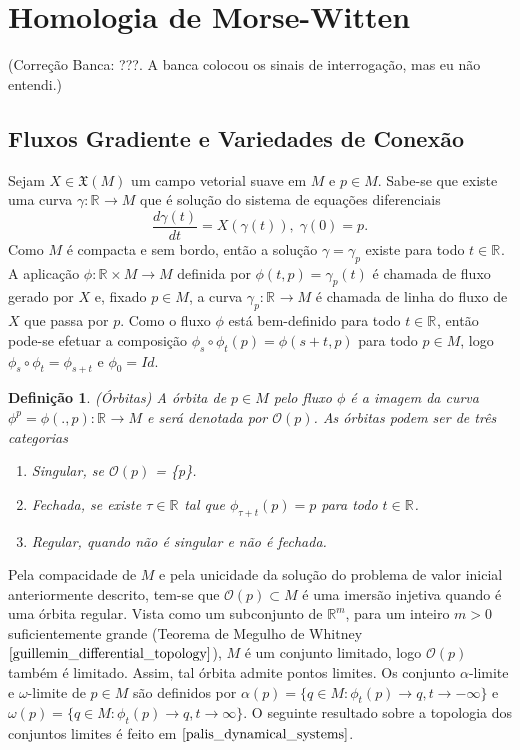 \documentclass[12pt]{book}
\newtheorem{definicao}[teorema]{Definição}
\newcommand{\campossuaves}[1]{\mathfrak{X}(#1)}
\newcommand{\derivada}[2]{\frac{d #1}{d #2}}
\newcommand{\orbitaponto}[1]{\mathcal{O}(#1)}
\newcommand{\retacartesianovariedade}{\real{} \times M}
\newcommand{\real}[1]{\mathbb{R}^{#1}}
\newcommand{\reta}{\real{}}
\newcommand{\alerta}[1]{{\color{red}#1}}
\newcommand{\correcaobanca}[1]{\alerta{(Correção Banca: #1)}}
\begin{document}
	
	\section{Homologia de Morse-Witten}
	\correcaobanca{???. A banca colocou os sinais de interrogação, mas eu não entendi.}
	\subsection{Fluxos Gradiente e Variedades de Conexão}\label{secao_fluxo_gradiente}
	Sejam $X \in \campossuaves{M}$ um campo vetorial suave em $M$ e $p \in M$. Sabe-se que existe uma curva $\gamma: \reta\to M$ que é solução do sistema de equações diferenciais 
	$$
	\derivada{\gamma(t)}{t} = X(\gamma(t)), \; \gamma(0) = p.
	$$
	Como $M$ é compacta e sem bordo, então a solução $\gamma = \gamma_{p}$ existe para todo $t\in \reta$. A aplicação $\phi: \retacartesianovariedade\to M$ definida por $\phi(t,p) = \gamma_{p}(t)$ é chamada de fluxo gerado por $X$ e, fixado $p\in M$, a curva $\gamma_{p}:\reta\to M$ é chamada de linha do fluxo de $X$ que passa por $p$. Como o fluxo $\phi$ está bem-definido para todo $t \in \reta$, então pode-se efetuar a composição $\phi_{s}\circ\phi_{t}(p) = \phi(s+t, p)$ para todo $p\in M$, logo $\phi_{s}\circ\phi_{t} = \phi_{s+t}$ e $\phi_{0} = Id$.
	\begin{definicao}
		(Órbitas) A órbita de $p \in M$ pelo fluxo $\phi$ é a imagem da curva $\phi^{p} = \phi(.,p):\reta\to M$ e será denotada por $\orbitaponto{p}$. As órbitas podem ser de três categorias
		\begin{enumerate}
			\item Singular, se $\orbitaponto{p}$ = \{p\}.
			
			\item Fechada, se existe $\tau \in \reta$ tal que $\phi_{\tau+t}(p) = p$ para todo $t \in \reta$.
			
			\item Regular, quando não é singular e não é fechada.
		\end{enumerate}
		
	\end{definicao}
	
	Pela compacidade de $M$ e pela unicidade da solução do problema de valor inicial anteriormente descrito, tem-se que $\orbitaponto{p}\subset M$ é uma imersão injetiva quando é uma órbita regular. Vista como um subconjunto de $\real{m}$, para um inteiro $m>0$ suficientemente grande (Teorema de Megulho de Whitney $\cite{guillemin_differential_topology}$), $M$ é um conjunto limitado, logo $\orbitaponto{p}$ também é limitado. Assim, tal órbita admite pontos limites. Os conjunto $\alpha$-limite e $\omega$-limite de $p \in M$ são definidos por $\alpha(p) = \{q \in M: \phi_{t}(p) \to q, t \to -\infty\}$ e $\omega(p) = \{q \in M: \phi_{t}(p) \to q, t \to \infty\}$. O seguinte resultado sobre a topologia dos conjuntos limites é feito em $\cite{palis_dynamical_systems}$.
	
\end{document}
